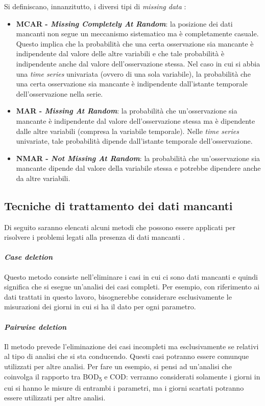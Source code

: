 Si definiscano, innanzitutto, i diversi tipi di \textit{missing data} \cite{Moritz2015ComparisonOD}:
\begin{itemize}
	\item \textbf{MCAR - \textit{Missing Completely At Random}}: la posizione dei dati mancanti non segue un meccanismo sistematico ma è completamente casuale. Questo implica che la probabilità che una certa osservazione sia mancante è indipendente dal valore delle altre variabili e che tale probabilità è indipendente anche dal valore dell'osservazione stessa. Nel caso in cui si abbia una \textit{time series} univariata (ovvero di una sola variabile), la probabilità che una certa osservazione sia mancante è indipendente dall'istante temporale dell'osservazione nella serie.
	\item \textbf{MAR - \textit{Missing At Random}}: la probabilità che un'osservazione sia mancante è indipendente dal valore dell'osservazione stessa ma è dipendente dalle altre variabili (compresa la variabile temporale). Nelle \textit{time series} univariate, tale probabilità dipende dall'istante temporale dell'osservazione.
	\item \textbf{NMAR - \textit{Not Missing At Random}}: la probabilità che un'osservazione sia mancante dipende dal valore della variabile stessa e potrebbe dipendere anche da altre variabili.
\end{itemize}

\subsection{Tecniche di trattamento dei dati mancanti}
\label{subsec:NAhandling}
Di seguito saranno elencati alcuni metodi che possono essere applicati per risolvere i problemi legati alla presenza di dati mancanti \cite{article}.

\paragraph*{\textit{Case deletion}}
Questo metodo consiste nell'eliminare i casi in cui ci sono dati mancanti e quindi significa che si esegue un'analisi dei casi completi. Per esempio, con riferimento ai dati trattati in questo lavoro, bisognerebbe considerare esclusivamente le misurazioni dei giorni in cui si ha il dato per ogni parametro.

\paragraph*{\textit{Pairwise deletion}} 
Il metodo prevede l'eliminazione dei casi incompleti ma esclusivamente se relativi al tipo di analisi che si sta conducendo. Questi casi potranno essere comunque utilizzati per altre analisi. Per fare un esempio, si pensi ad un'analisi che coinvolga il rapporto tra BOD\textsubscript{5} e COD: verranno considerati solamente i giorni in cui si hanno le misure di entrambi i parametri, ma i giorni scartati potranno essere utilizzati per altre analisi.

